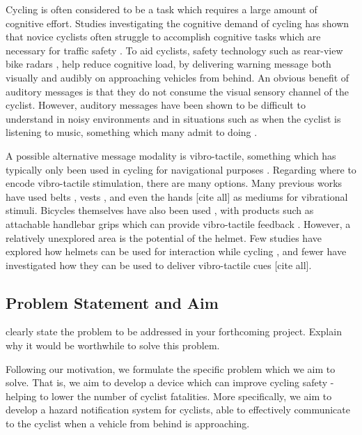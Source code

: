 \documentclass{interim}
\begin{document}
Cycling is often considered to be a task which requires a large amount of cognitive effort. Studies investigating the cognitive demand of cycling has shown that novice cyclists often struggle to accomplish cognitive tasks which are necessary for traffic safety \cite{https://doi.org/10.1002/acp.2350050205}. To aid cyclists, safety technology such as rear-view bike radars \cite{garminradar}, help reduce cognitive load, by delivering warning message both visually and audibly on approaching vehicles from behind. An obvious benefit of auditory messages is that they do not consume the visual sensory channel of the cyclist. However, auditory messages have been shown to be difficult to understand in noisy environments \cite{noisyenv} and in situations such as when the cyclist is listening to music, something which many admit to doing \cite{DEWAARD2011626}.

A possible alternative message modality is vibro-tactile, something which has typically only been used in cycling for navigational purposes \cite{10.1145/2371574.2371631, 10.1145/1613858.1613911}. Regarding where to encode vibro-tactile stimulation, there are many options. Many previous works have used belts \cite{10.1145/1613858.1613911, 10.1145/1463160.1463179, tsukada2004activebelt, 10.1145/2449396.2449450, 10.1145/1060581.1060585}, vests \cite{729547, 998954, van2000tactile}, and even the hands [cite all] as mediums for vibrational stimuli. Bicycles themselves have also been used \cite{10.1145/2371574.2371631, 10.1145/3290605.3300850}, with products such as attachable handlebar grips which can provide vibro-tactile feedback \cite{smartgrips}. However, a relatively unexplored area is the potential of the helmet. Few studies have explored how helmets can be used for interaction while cycling \cite{10.1145/2559206.2574803, 10.1145/1240866.1241027}, and fewer have investigated how they can be used to deliver vibro-tactile cues [cite all].

\subsection{Problem Statement and Aim}
clearly state the problem to be addressed in your forthcoming project. Explain why it would be worthwhile to solve this problem.


Following our motivation, we formulate the specific problem which we aim to solve. That is, we aim to develop a device which can improve cycling safety - helping to lower the number of cyclist fatalities. More specifically, we aim to develop a hazard notification system for cyclists, able to effectively communicate to the cyclist when a vehicle from behind is approaching. 
\end{document}
